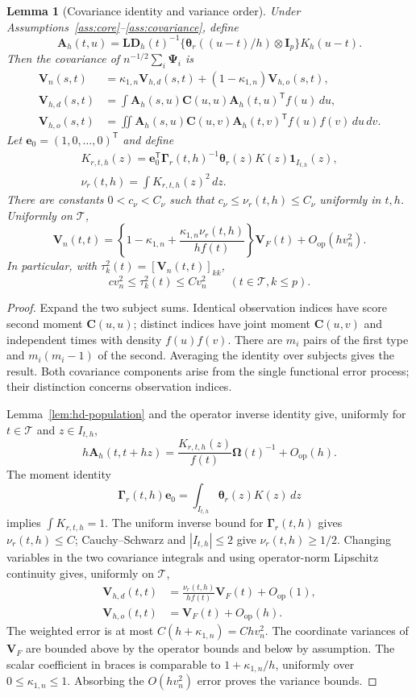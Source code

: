 \documentclass[12pt]{article}
\newtheorem{lemma}{Lemma}
\newcommand{\be}{{\mathbf e}}
\newcommand{\bA}{{\mathbf A}}
\newcommand{\bC}{{\mathbf C}}
\newcommand{\bD}{{\mathbf D}}
\newcommand{\bI}{{\mathbf I}}
\newcommand{\bL}{{\mathbf L}}
\newcommand{\bV}{{\mathbf V}}
\newcommand{\btheta}  {\boldsymbol{\theta}}
\newcommand{\bGamma} {\boldsymbol{\Gamma}}
\newcommand{\bPsi} {\boldsymbol{\Psi}}
\newcommand{\bOmega} {\boldsymbol{\Omega}}
\newcommand{\trans}{{\scriptscriptstyle\mathsf{T}}}
\numberwithin{equation}{section}
\begin{document}
\begin{lemma}[Covariance identity and variance order]
\label{lem:hd-covariance}
Under Assumptions~\ref{ass:core}--\ref{ass:covariance}, define
\[
\bA_h(t,u)=\bL\bD_h(t)^{-1}
\{\btheta_r((u-t)/h)\otimes\bI_p\}K_h(u-t).
\]
Then the covariance of $n^{-1/2}\sum_i\bPsi_i$ is
\[
\begin{split}
\bV_n(s,t)&=\kappa_{1,n}\bV_{h,d}(s,t)
+(1-\kappa_{1,n})\bV_{h,o}(s,t),\\
\bV_{h,d}(s,t)&=\int\bA_h(s,u)\bC(u,u)\bA_h(t,u)^\trans f(u)\,du,\\
\bV_{h,o}(s,t)&=\iint\bA_h(s,u)\bC(u,v)
\bA_h(t,v)^\trans f(u)f(v)\,du\,dv.
\end{split}
\]
Let $\be_0=(1,0,\ldots,0)^\trans$ and define
\[
\begin{gathered}
K_{r,t,h}(z)=\be_0^\trans\bGamma_r(t,h)^{-1}
\btheta_r(z)K(z)\mathbf1_{I_{t,h}}(z),\\
\nu_r(t,h)=\int K_{r,t,h}(z)^2\,dz.
\end{gathered}
\]
There are constants $0<c_\nu<C_\nu$ such that
$c_\nu\le\nu_r(t,h)\le C_\nu$ uniformly in $t,h$.
Uniformly on $\mathcal T$,
\[
\bV_n(t,t)=\left\{1-\kappa_{1,n}+
\frac{\kappa_{1,n}\nu_r(t,h)}{h f(t)}\right\}\bV_F(t)
+O_{\mathrm{op}}(hv_n^2).
\]
In particular, with $\tau_k^2(t)=[\bV_n(t,t)]_{kk}$,
\[
cv_n^2\le\tau_k^2(t)\le Cv_n^2\qquad(t\in\mathcal T, k\le p).
\]
\end{lemma}

\begin{proof}
Expand the two subject sums.  Identical observation indices have
score second moment $\bC(u,u)$; distinct indices have joint moment
$\bC(u,v)$ and independent times with density $f(u)f(v)$.
There are $m_i$ pairs of the first type and $m_i(m_i-1)$ of the
second.  Averaging the identity over subjects gives the result.
Both covariance components arise from the single functional error
process; their distinction concerns observation indices.

Lemma~\ref{lem:hd-population} and the operator inverse identity give,
uniformly for $t\in\mathcal T$ and $z\in I_{t,h}$,
\[
h\bA_h(t,t+hz)=\frac{K_{r,t,h}(z)}{f(t)}\bOmega(t)^{-1}
+O_{\mathrm{op}}(h).
\]
The moment identity
\[
\bGamma_r(t,h)\be_0=\int_{I_{t,h}}\btheta_r(z)K(z)\,dz
\]
implies $\int K_{r,t,h}=1$. The uniform inverse bound for
$\bGamma_r(t,h)$ gives $\nu_r(t,h)\le C$; Cauchy--Schwarz and
$|I_{t,h}|\le2$ give $\nu_r(t,h)\ge1/2$.
Changing variables in the two covariance integrals and using
operator-norm Lipschitz continuity gives, uniformly on $\mathcal T$,
\[
\begin{aligned}
\bV_{h,d}(t,t)&=\frac{\nu_r(t,h)}{hf(t)}\bV_F(t)
+O_{\mathrm{op}}(1),\\
\bV_{h,o}(t,t)&=\bV_F(t)+O_{\mathrm{op}}(h).
\end{aligned}
\]
The weighted error is at most $C(h+\kappa_{1,n})=Chv_n^2$.
The coordinate variances of $\bV_F$ are bounded above by the
operator bounds and below by assumption.  The scalar coefficient
in braces is comparable to $1+\kappa_{1,n}/h$, uniformly over
$0\le\kappa_{1,n}\le1$.  Absorbing the $O(hv_n^2)$ error proves
the variance bounds.
\end{proof}
\end{document}
